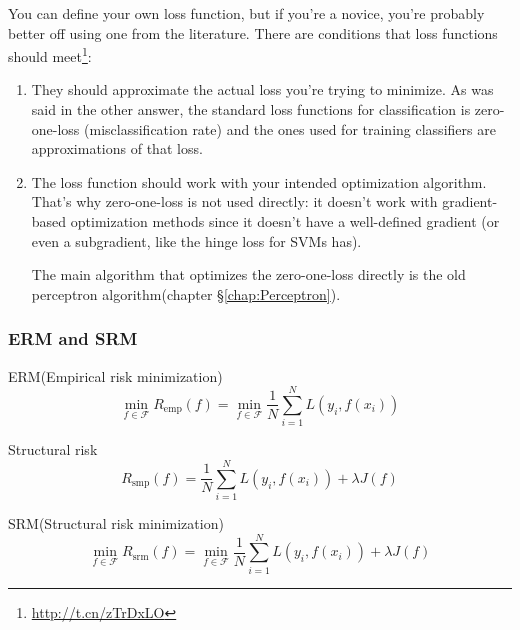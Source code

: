 You can define your own loss function, but if you're a novice, you're probably better off using one from the literature. There are conditions that loss functions should meet\footnote{\url{http://t.cn/zTrDxLO}}:
\begin{enumerate}
\item They should approximate the actual loss you're trying to minimize. As was said in the other answer, the standard loss functions for classification is zero-one-loss (misclassification rate) and the ones used for training classifiers are approximations of that loss.
\item The loss function should work with your intended optimization algorithm. That's why zero-one-loss is not used directly: it doesn't work with gradient-based optimization methods since it doesn't have a well-defined gradient (or even a subgradient, like the hinge loss for SVMs has).

The main algorithm that optimizes the zero-one-loss directly is the old perceptron algorithm(chapter \S \ref{chap:Perceptron}).
\end{enumerate}


\subsubsection{ERM and SRM}
\begin{definition}
ERM(Empirical risk minimization)
\begin{equation}
\min\limits _{f \in \mathcal{F}} R_{\mathrm{emp}}(f)=\min\limits _{f \in \mathcal{F}} \dfrac{1}{N}\sum\limits_{i=1}^{N} L\left(y_i,f(x_i)\right)
\end{equation}
\end{definition}

\begin{definition}
Structural risk
\begin{equation}
R_{\mathrm{smp}}(f)=\dfrac{1}{N}\sum\limits_{i=1}^{N} L\left(y_i,f(x_i)\right) +\lambda J(f)
\end{equation}
\end{definition}

\begin{definition}
SRM(Structural risk minimization)
\begin{equation}
\min\limits _{f \in \mathcal{F}} R_{\mathrm{srm}}(f)=\min\limits _{f \in \mathcal{F}} \dfrac{1}{N}\sum\limits_{i=1}^{N} L\left(y_i,f(x_i)\right) +\lambda J(f)
\end{equation}
\end{definition}


